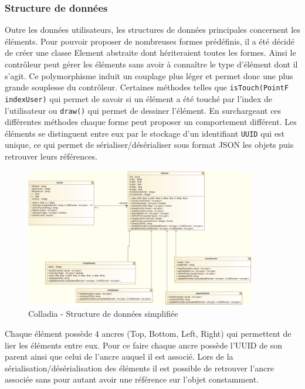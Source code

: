 \subsubsection{Structure de données}
Outre les données utilisateurs, les structures de données principales concernent les éléments. Pour pouvoir proposer de nombreuses formes prédéfinis, il a été décidé de créer une classe Element abstraite dont hériteraient toutes les formes. Ainsi le contrôleur peut gérer les éléments sans avoir à connaître le type d'élément dont il s'agit. Ce polymorphisme induit un couplage plus léger et permet donc une plus grande souplesse du contrôleur.
Certaines méthodes telles que \lstinline$isTouch(PointF indexUser)$ qui permet de savoir si un élément a été touché par l'index de l'utilisateur ou \lstinline$draw()$ qui permet de dessiner l'élément. En surchargeant ces différentes méthodes chaque forme peut proposer un comportement différent.
Les éléments se distinguent entre eux par le stockage d'un identifiant \lstinline$UUID$ qui est unique, ce qui permet de sérialiser/désérialiser sous format JSON les objets puis retrouver leurs références. 
	\begin{figure}[!h]
		\centering
		\includegraphics[width=0.9\textwidth]{img/UmlArchiStructureData}
		\caption{Colladia - Structure de données simplifiée}
	\end{figure}
Chaque élément possède 4 ancres (Top, Bottom, Left, Right) qui permettent de lier les éléments entre eux. Pour ce faire chaque ancre possède l'UUID de son parent ainsi que celui de l'ancre auquel il est associé. Lors de la sérialisation/désérialisation des éléments il est possible de retrouver l'ancre associée sans pour autant avoir une référence sur l'objet constamment.

